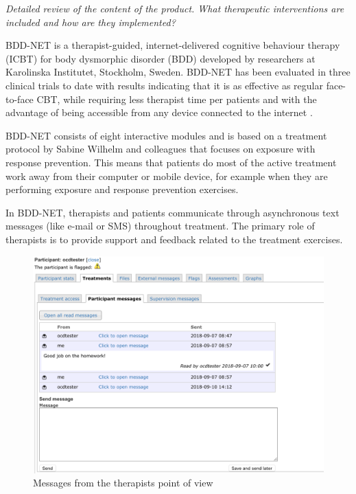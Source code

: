 \documentclass[]{book}
\theoremstyle{definition}
\theoremstyle{definition}
\theoremstyle{definition}
\theoremstyle{remark}
\begin{document}
\emph{Detailed review of the content of the product. What therapeutic
interventions are included and how are they implemented?}

BDD-NET is a therapist-guided, internet-delivered cognitive behaviour
therapy (ICBT) for body dysmorphic disorder (BDD) developed by
researchers at Karolinska Institutet, Stockholm, Sweden. BDD-NET has
been evaluated in three clinical trials to date with results indicating
that it is as effective as regular face-to-face CBT, while requiring
less therapist time per patients and with the advantage of being
accessible from any device connected to the internet
\citep{enander2014, enander2016}.

BDD-NET consists of eight interactive modules and is based on a
treatment protocol by Sabine Wilhelm and colleagues \citep{wilhelm2013}
that focuses on exposure with response prevention. This means that
patients do most of the active treatment work away from their computer
or mobile device, for example when they are performing exposure and
response prevention exercises.

In BDD-NET, therapists and patients communicate through asynchronous
text messages (like e-mail or SMS) throughout treatment. The primary
role of therapists is to provide support and feedback related to the
treatment exercises.

\begin{figure}
\centering
\includegraphics[width=5.20833in,height=\textheight]{images/therapist-messages.png}
\caption{Messages from the therapists point of view}
\end{figure}
\end{document}
